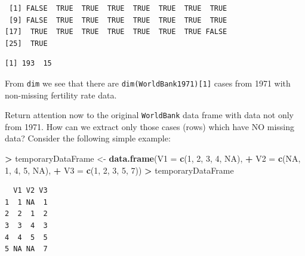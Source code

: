 \documentclass[]{krantz}
\makeatletter
\newenvironment{Shaded}{\begin{snugshade}}{\end{snugshade}}
\newcommand{\KeywordTok}[1]{\textcolor[rgb]{0.27,0.27,0.27}{\textbf{#1}}}
\newcommand{\DataTypeTok}[1]{\textcolor[rgb]{0.27,0.27,0.27}{#1}}
\newcommand{\DecValTok}[1]{\textcolor[rgb]{0.06,0.06,0.06}{#1}}
\newcommand{\StringTok}[1]{\textcolor[rgb]{0.5,0.5,0.5}{#1}}
\newcommand{\OtherTok}[1]{\textcolor[rgb]{0.37,0.37,0.37}{#1}}
\newcommand{\OperatorTok}[1]{\textcolor[rgb]{0.43,0.43,0.43}{\textbf{#1}}}
\newcommand{\NormalTok}[1]{#1}
\newenvironment{kframe}{%
\medskip{}
\setlength{\fboxsep}{.8em}
 \def\at@end@of@kframe{}%
 \ifinner\ifhmode%
  \def\at@end@of@kframe{\end{minipage}}%
  \begin{minipage}{\columnwidth}%
 \fi\fi%
 \def\FrameCommand##1{\hskip\@totalleftmargin \hskip-\fboxsep
 \colorbox{shadecolor}{##1}\hskip-\fboxsep
     \hskip-\linewidth \hskip-\@totalleftmargin \hskip\columnwidth}%
 \MakeFramed {\advance\hsize-\width
   \@totalleftmargin\z@ \linewidth\hsize
   \@setminipage}}%
 {\par\unskip\endMakeFramed%
 \at@end@of@kframe}
\renewenvironment{Shaded}{\begin{kframe}}{\end{kframe}}
\makeatother
\begin{document}
\begin{verbatim}
 [1] FALSE  TRUE  TRUE  TRUE  TRUE  TRUE  TRUE  TRUE
 [9] FALSE  TRUE  TRUE  TRUE  TRUE  TRUE  TRUE  TRUE
[17]  TRUE  TRUE  TRUE  TRUE  TRUE  TRUE  TRUE FALSE
[25]  TRUE
\end{verbatim}

\begin{Shaded}
\end{Shaded}

\begin{verbatim}
[1] 193  15
\end{verbatim}

From \texttt{dim} we see that there are
\texttt{dim(WorldBank1971){[}1{]}} cases from 1971 with non-missing
fertility rate data.

Return attention now to the original \texttt{WorldBank} data frame with
data not only from 1971. How can we extract only those cases (rows)
which have NO missing data? Consider the following simple example:

\begin{Shaded}
\begin{Highlighting}[]
\OperatorTok{>}\StringTok{ }\NormalTok{temporaryDataFrame <-}\StringTok{ }\KeywordTok{data.frame}\NormalTok{(}\DataTypeTok{V1 =} \KeywordTok{c}\NormalTok{(}\DecValTok{1}\NormalTok{, }\DecValTok{2}\NormalTok{, }\DecValTok{3}\NormalTok{, }\DecValTok{4}\NormalTok{, }\OtherTok{NA}\NormalTok{),}
\OperatorTok{+}\StringTok{                                  }\DataTypeTok{V2 =} \KeywordTok{c}\NormalTok{(}\OtherTok{NA}\NormalTok{, }\DecValTok{1}\NormalTok{, }\DecValTok{4}\NormalTok{, }\DecValTok{5}\NormalTok{, }\OtherTok{NA}\NormalTok{),}
\OperatorTok{+}\StringTok{                                  }\DataTypeTok{V3 =} \KeywordTok{c}\NormalTok{(}\DecValTok{1}\NormalTok{, }\DecValTok{2}\NormalTok{, }\DecValTok{3}\NormalTok{, }\DecValTok{5}\NormalTok{, }\DecValTok{7}\NormalTok{))}
\OperatorTok{>}\StringTok{ }\NormalTok{temporaryDataFrame}
\end{Highlighting}
\end{Shaded}

\begin{verbatim}
  V1 V2 V3
1  1 NA  1
2  2  1  2
3  3  4  3
4  4  5  5
5 NA NA  7
\end{verbatim}
\end{document}
